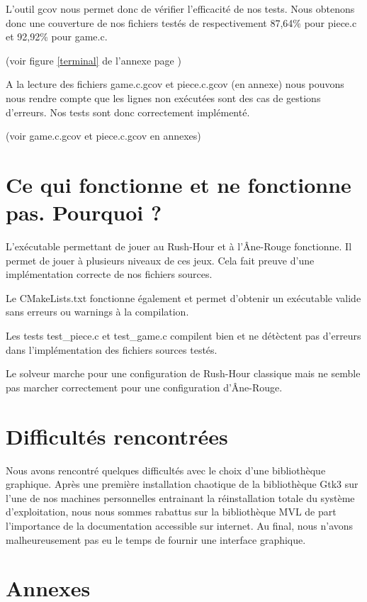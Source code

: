 \documentclass{report}
\begin{document}
L'outil gcov nous permet donc de vérifier l'efficacité de nos tests. Nous obtenons donc une couverture de nos fichiers testés de respectivement 87,64\% pour piece.c et 92,92\% pour game.c.

\begin{center} (voir figure \ref{terminal} de l'annexe page \pageref{terminal})\end{center}

A la lecture des fichiers game.c.gcov et piece.c.gcov (en annexe) nous pouvons nous rendre compte que les lignes non exécutées sont des cas de gestions d'erreurs. Nos tests sont donc correctement implémenté.

\begin{center} (voir game.c.gcov et piece.c.gcov en annexes)\end{center}

\chapter{Ce qui fonctionne et ne fonctionne pas. Pourquoi ?}
L'exécutable permettant de jouer au Rush-Hour et à l'Âne-Rouge fonctionne. Il permet de jouer à plusieurs niveaux de ces jeux. Cela fait preuve d'une implémentation correcte de nos fichiers sources. 

Le CMakeLists.txt fonctionne également et permet d'obtenir un exécutable valide sans erreurs ou warnings à la compilation.

Les tests test\_piece.c et test\_game.c compilent bien et ne détèctent pas d'erreurs dans l'implémentation des fichiers sources testés.

Le solveur marche pour une configuration de Rush-Hour classique mais ne semble pas marcher correctement pour une configuration d'Âne-Rouge.
\chapter{Difficultés rencontrées}
Nous avons rencontré quelques difficultés avec le choix d'une bibliothèque graphique. Après une première installation chaotique de la bibliothèque Gtk3 sur l'une de nos machines personnelles entrainant la réinstallation totale du système d'exploitation, nous nous sommes rabattus sur la bibliothèque MVL de part l'importance de la documentation accessible sur internet. Au final, nous n'avons malheureusement pas eu le temps de fournir une interface graphique.
\chapter*{Annexes}
\end{document}
